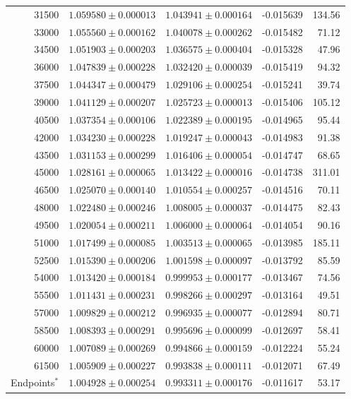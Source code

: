\begin{tabular}{rrrrr}
31500 & $1.059580 \pm 0.000013$ & $1.043941 \pm 0.000164$ & -0.015639 & 134.56 \\
33000 & $1.055560 \pm 0.000162$ & $1.040078 \pm 0.000262$ & -0.015482 & 71.12 \\
34500 & $1.051903 \pm 0.000203$ & $1.036575 \pm 0.000404$ & -0.015328 & 47.96 \\
36000 & $1.047839 \pm 0.000228$ & $1.032420 \pm 0.000039$ & -0.015419 & 94.32 \\
37500 & $1.044347 \pm 0.000479$ & $1.029106 \pm 0.000254$ & -0.015241 & 39.74 \\
39000 & $1.041129 \pm 0.000207$ & $1.025723 \pm 0.000013$ & -0.015406 & 105.12 \\
40500 & $1.037354 \pm 0.000106$ & $1.022389 \pm 0.000195$ & -0.014965 & 95.44 \\
42000 & $1.034230 \pm 0.000228$ & $1.019247 \pm 0.000043$ & -0.014983 & 91.38 \\
43500 & $1.031153 \pm 0.000299$ & $1.016406 \pm 0.000054$ & -0.014747 & 68.65 \\
45000 & $1.028161 \pm 0.000065$ & $1.013422 \pm 0.000016$ & -0.014738 & 311.01 \\
46500 & $1.025070 \pm 0.000140$ & $1.010554 \pm 0.000257$ & -0.014516 & 70.11 \\
48000 & $1.022480 \pm 0.000246$ & $1.008005 \pm 0.000037$ & -0.014475 & 82.43 \\
49500 & $1.020054 \pm 0.000211$ & $1.006000 \pm 0.000064$ & -0.014054 & 90.16 \\
51000 & $1.017499 \pm 0.000085$ & $1.003513 \pm 0.000065$ & -0.013985 & 185.11 \\
52500 & $1.015390 \pm 0.000206$ & $1.001598 \pm 0.000097$ & -0.013792 & 85.59 \\
54000 & $1.013420 \pm 0.000184$ & $0.999953 \pm 0.000177$ & -0.013467 & 74.56 \\
55500 & $1.011431 \pm 0.000231$ & $0.998266 \pm 0.000297$ & -0.013164 & 49.51 \\
57000 & $1.009829 \pm 0.000212$ & $0.996935 \pm 0.000077$ & -0.012894 & 80.71 \\
58500 & $1.008393 \pm 0.000291$ & $0.995696 \pm 0.000099$ & -0.012697 & 58.41 \\
60000 & $1.007089 \pm 0.000269$ & $0.994866 \pm 0.000159$ & -0.012224 & 55.24 \\
61500 & $1.005909 \pm 0.000227$ & $0.993838 \pm 0.000111$ & -0.012071 & 67.49 \\
Endpoints$^{*}$ & $1.004928 \pm 0.000254$ & $0.993311 \pm 0.000176$ & -0.011617 & 53.17 \\
\hline
\end{tabular}
